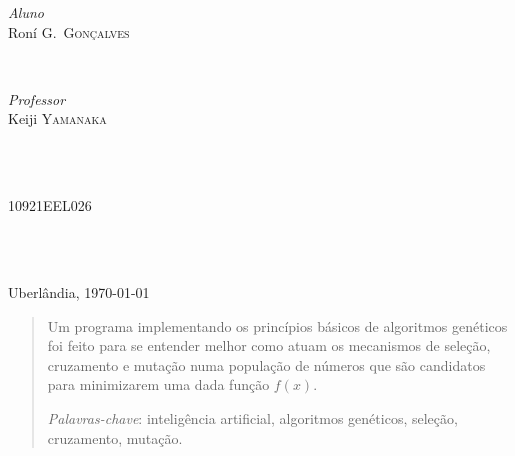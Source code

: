 \documentclass[11pt]{article}
\begin{document}
\begin{titlepage}
\begin{minipage}{0.4\textwidth}
\begin{flushleft} \large
\emph{Aluno}\\
Roní G.\ \textsc{Gonçalves}\\%
\end{flushleft}
\end{minipage}
~
\begin{minipage}{0.4\textwidth}
\begin{flushright} \large
\emph{Professor} \\
Keiji \textsc{Yamanaka}\\ %
\end{flushright}
\end{minipage}\\[0.1cm]
~
\begin{minipage}{0.85\textwidth}
\begin{flushleft} \large
10921EEL026 %
\end{flushleft}
\end{minipage}\\[3cm]
~


{\large Uberlândia, \today}\\[1cm] %


\vfill %

\end{titlepage}

\setcounter{page}{2}

\newpage

\begin{abstract}
Um programa implementando os princípios básicos de algoritmos genéticos foi feito para se entender melhor como atuam os mecanismos de seleção, cruzamento e mutação numa população de números que são candidatos para minimizarem uma dada função $f(x)$.

\emph{Palavras-chave}: inteligência artificial, algoritmos genéticos, seleção, cruzamento, mutação.
\end{abstract}
\end{document}
